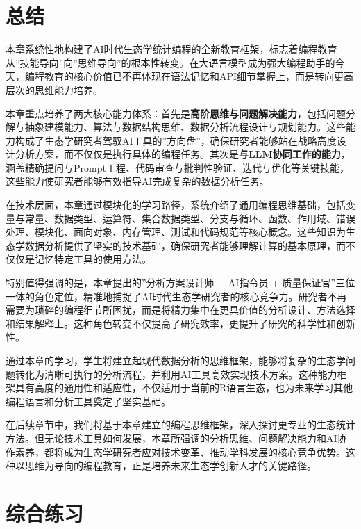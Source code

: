 \documentclass[
  twoside]{book}
\begin{document}
\hypertarget{ux603bux7ed3}{%
\section{总结}\label{ux603bux7ed3}}

本章系统性地构建了AI时代生态学统计编程的全新教育框架，标志着编程教育从''技能导向''向''思维导向''的根本性转变。在大语言模型成为强大编程助手的今天，编程教育的核心价值已不再体现在语法记忆和API细节掌握上，而是转向更高层次的思维能力培养。

本章重点培养了两大核心能力体系：首先是\textbf{高阶思维与问题解决能力}，包括问题分解与抽象建模能力、算法与数据结构思维、数据分析流程设计与规划能力。这些能力构成了生态学研究者驾驭AI工具的''方向盘''，确保研究者能够站在战略高度设计分析方案，而不仅仅是执行具体的编程任务。其次是\textbf{与LLM协同工作的能力}，涵盖精确提问与Prompt工程、代码审查与批判性验证、迭代与优化等关键技能，这些能力使研究者能够有效指导AI完成复杂的数据分析任务。

在技术层面，本章通过模块化的学习路径，系统介绍了通用编程思维基础，包括变量与常量、数据类型、运算符、集合数据类型、分支与循环、函数、作用域、错误处理、模块化、面向对象、内存管理、测试和代码规范等核心概念。这些知识为生态学数据分析提供了坚实的技术基础，确保研究者能够理解计算的基本原理，而不仅仅是记忆特定工具的使用方法。

特别值得强调的是，本章提出的''分析方案设计师 + AI指令员 + 质量保证官''三位一体的角色定位，精准地捕捉了AI时代生态学研究者的核心竞争力。研究者不再需要为琐碎的编程细节所困扰，而是将精力集中在更具价值的分析设计、方法选择和结果解释上。这种角色转变不仅提高了研究效率，更提升了研究的科学性和创新性。

通过本章的学习，学生将建立起现代数据分析的思维框架，能够将复杂的生态学问题转化为清晰可执行的分析流程，并利用AI工具高效实现技术方案。这种能力框架具有高度的通用性和适应性，不仅适用于当前的R语言生态，也为未来学习其他编程语言和分析工具奠定了坚实基础。

在后续章节中，我们将基于本章建立的编程思维框架，深入探讨更专业的生态统计方法。但无论技术工具如何发展，本章所强调的分析思维、问题解决能力和AI协作素养，都将成为生态学研究者应对技术变革、推动学科发展的核心竞争优势。这种以思维为导向的编程教育，正是培养未来生态学创新人才的关键路径。

\hypertarget{ux7efcux5408ux7ec3ux4e60}{%
\section{综合练习}\label{ux7efcux5408ux7ec3ux4e60}}
\end{document}
